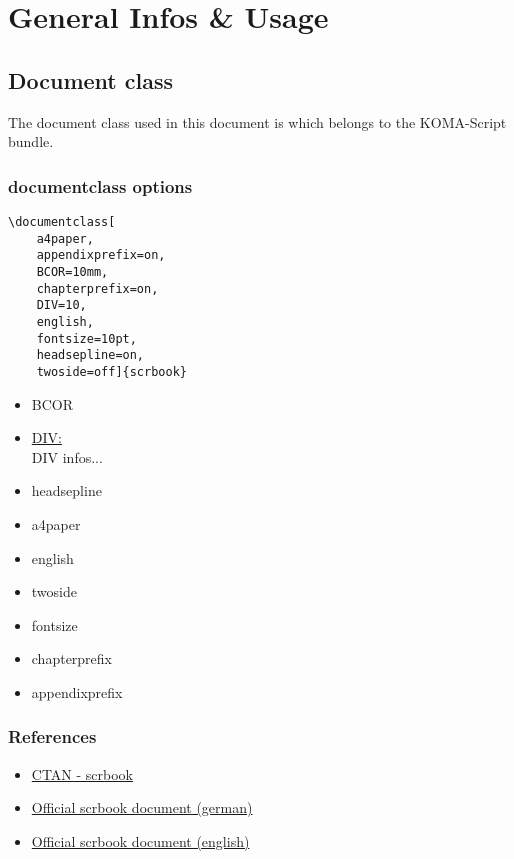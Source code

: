 \section{General Infos \& Usage}
\subsection{Document class}
The document class used in this document is  which belongs to the
KOMA-Script bundle.
\subsubsection{documentclass options}
\begin{singlespace}
\begin{lstlisting}[style=cstm-lists-latex-sty]
\documentclass[
    a4paper,
    appendixprefix=on,
    BCOR=10mm,
    chapterprefix=on,
    DIV=10,
    english,
    fontsize=10pt,
    headsepline=on,
    twoside=off]{scrbook}
\end{lstlisting}
\end{singlespace}
\begin{itemize}
    \item{BCOR}
    \item{\href{http://mirrors.ibiblio.org/CTAN/macros/latex/contrib/koma-script/doc/scrguide.pdf\#desc:typearea.option.DIV}{DIV:}\\
        DIV infos...}
    \item{headsepline}
    \item{a4paper}
    \item{english}
    \item{twoside}
    \item{fontsize}
    \item{chapterprefix}
    \item{appendixprefix}
\end{itemize}
\subsubsection{References}
\begin{itemize}
    \item{\href{https://ctan.org/pkg/scrbook}{CTAN - scrbook}}
    \item{\href{http://www.pirbot.com/mirrors/ctan/macros/latex/contrib/koma-script/doc/scrguide.pdf}{Official scrbook document (german)}}
    \item{\href{http://www.pirbot.com/mirrors/ctan/macros/latex/contrib/koma-script/doc/scrguien.pdf}{Official scrbook document (english)}}
\end{itemize}
\onehalfspacing

